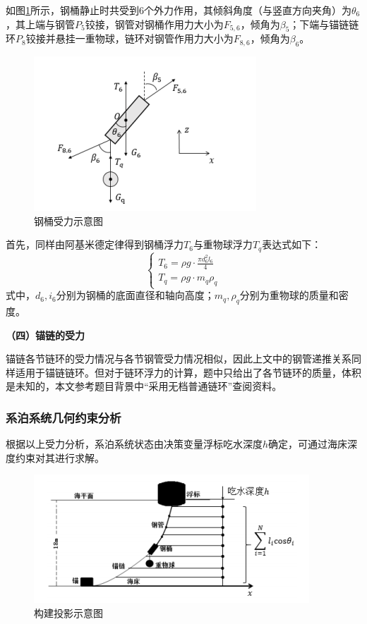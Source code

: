 \documentclass{article}
\numberwithin{equation}{subsection}
\begin{document}
如图\ref{钢桶受力}所示，钢桶静止时共受到6个外力作用，其倾斜角度（与竖直方向夹角）为$\theta_{6}$，其上端与钢管$P_{5}$铰接，钢管对钢桶作用力大小为$F_{5,6}$，倾角为$\beta_{5}$；下端与锚链链环$P_{8}$铰接并悬挂一重物球，链环对钢管作用力大小为$F_{8,6}$，倾角为$\beta_{6}$。
\begin{figure}[H]
  \centering
  \includegraphics[scale=0.6]{钢桶受力.png}
  \caption{\kaishu 钢桶受力示意图}
  \label{钢桶受力}
\end{figure}

首先，同样由阿基米德定律得到钢桶浮力$T_{6}$与重物球浮力$T_{q}$表达式如下：
\begin{equation}
\begin{cases}
T_{6}=\rho g\cdot\frac{\pi d_{6}^{2}l_{6}}{4}\\
T_{q}=\rho g\cdot m_{q}\rho_{q}
\end{cases}
\label{式子}
\end{equation}
式中，$d_{6},i_{6}$分别为钢桶的底面直径和轴向高度；$m_{q},\rho_{q}$分别为重物球的质量和密度。

\begin{flushleft}
\textbf{（四）锚链的受力}
\end{flushleft}

锚链各节链环的受力情况与各节钢管受力情况相似，因此上文中的钢管递推关系同样适用于锚链链环。但对于链环浮力的计算，题中只给出了各节链环的质量，体积是未知的，本文参考题目背景中“采用无档普通链环”查阅资料。


\subsubsection{系泊系统几何约束分析}
根据以上受力分析，系泊系统状态由决策变量浮标吃水深度$h$确定，可通过海床深度约束对其进行求解。
\begin{figure}[H]
  \centering
  \includegraphics[scale=0.6]{构建投影.png}
  \caption{\kaishu 构建投影示意图}
  \label{构建投影}
\end{figure}
\end{document}
